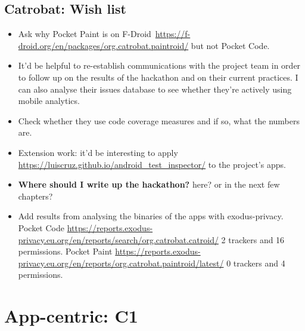 \subsection*{Catrobat: Wish list}
{\small
\begin{itemize}
    \itemsep0em
    \item Ask why Pocket Paint is on F-Droid~\url{https://f-droid.org/en/packages/org.catrobat.paintroid/} but not Pocket Code.
    \item It'd be helpful to re-establish communications with the project team in order to follow up on the results of the hackathon and on their current practices. I can also analyse their issues database to see whether they're actively using mobile analytics.
    \item Check whether they use code coverage measures and if so, what the numbers are.
    \item Extension work: it'd be interesting to apply \url{https://luiscruz.github.io/android_test_inspector/} to the project's apps.
    \item \textbf{Where should I write up the hackathon?} here? or in the next few chapters?
    \item Add results from analysing the binaries of the apps with exodus-privacy. Pocket Code \url{https://reports.exodus-privacy.eu.org/en/reports/search/org.catrobat.catroid/} 2 trackers and 16 permissions. Pocket Paint \url{https://reports.exodus-privacy.eu.org/en/reports/org.catrobat.paintroid/latest/} 0 trackers and 4 permissions.
\end{itemize}
}  %

\clearpage


\section{App-centric: C1}~\label{case-study-overview-C1}

